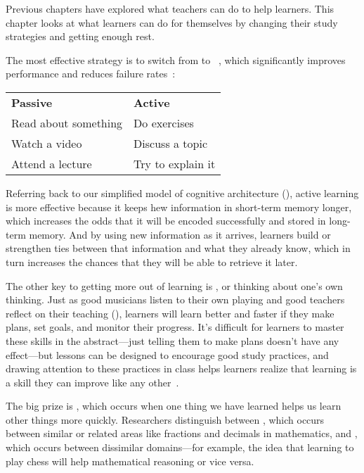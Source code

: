 
Previous chapters have explored what teachers can do to help learners.
This chapter looks at what learners can do for themselves
by changing their study strategies and getting enough rest.

The most effective strategy is to switch from 
to ~\cite{Hpl2018},
which significantly improves performance and reduces failure rates~\cite{Free2014}:

\begin{longtable}{ll}
\textbf{Passive}		& \textbf{Active} \\
Read about something		& Do exercises \\
Watch a video			& Discuss a topic \\
Attend a lecture		& Try to explain it
\end{longtable}

\noindent
Referring back to our simplified model of cognitive architecture (),
active learning is more effective because it keeps hew information in short-term memory longer,
which increases the odds that it will be encoded successfully and stored in long-term memory.
And by using new information as it arrives,
learners build or strengthen ties between that information and what they already know,
which in turn increases the chances that they will be able to retrieve it later.

The other key to getting more out of learning is ,
or thinking about one's own thinking.
Just as good musicians listen to their own playing
and good teachers reflect on their teaching (),
learners will learn better and faster if they make plans,
set goals,
and monitor their progress.
It's difficult for learners to master these skills in the abstract---just telling them
to make plans doesn't have any effect---but
lessons can be designed to encourage good study practices,
and drawing attention to these practices in class
helps learners realize that learning is a skill they can improve like any other~\cite{McGu2015,Miya2018}.

The big prize is ,
which occurs when one thing we have learned helps us learn other things more quickly.
Researchers distinguish between ,
which occurs between similar or related areas like fractions and decimals in mathematics,
and ,
which occurs between dissimilar domains---for example,
the idea that learning to play chess will help mathematical reasoning or vice versa.

